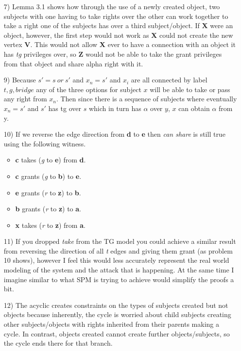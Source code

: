 \documentclass[journal,onecolumn]{IEEEtran}
\begin{document}
\begin{enumerate}
  \item [7)] Lemma 3.1 shows how through the use of a newly created object, two subjects with one having to take rights over the other can work together to take a right one of the subjects has over a third subject/object. If \textbf{X} were an object, however, the first step would not work as \textbf{X} could not create the new vertex \textbf{V}. This would not allow \textbf{X} ever to have a connection with an object it has \textit{tg} privileges over, so \textbf{Z} would not be able to take the grant privileges from that object and share alpha right with it. 
  \item [9)] Because \(s' = s\:or\:s'\) and \(x_n = s'\) and \(x_i\) are all connected by label \(t,g,bridge\) any of the three options for subject \(x\) will be able to take or pass any right from \(x_n\). Then since there is a sequence of subjects where eventually \(x_n = s'\) and \(s'\) has tg over \(s\) which in turn has \(\alpha\) over \(y\), \(x\) can obtain \(\alpha\) from y. 
  \item [10)] If we reverse the edge direction from \textbf{d} to \textbf{e} then \textit{can share} is still true using the following witness.
  \begin{itemize}
    \item \textbf{c} takes (\textit{g} to \textbf{e}) from \textbf{d}.
    \item \textbf{c} grants (\textit{g} to \textbf{b}) to \textbf{e}.
    \item \textbf{e} grants (\textit{r} to \textbf{z}) to \textbf{b}.
    \item \textbf{b} grants (\textit{r} to \textbf{z}) to \textbf{a}.
    \item \textbf{x} takes (\textit{r} to \textbf{z}) from \textbf{a}.
  \end{itemize}
  \item [11)] If you dropped \textit{take} from the TG model you could achieve a similar result from reversing the direction of all \textit{t} edges and giving them grant (as problem 10 shows), however I feel this would less accurately represent the real world modeling of the system and the attack that is happening. At the same time I imagine similar to what SPM is trying to achieve would simplify the proofs a bit. 
  \item [12)] The acyclic creates constraints on the types of subjects created but not objects because inherently, the cycle is worried about child subjects creating other subjects/objects with rights inherited from their parents making a cycle. In contrast, objects created cannot create further objects/subjects, so the cycle ends there for that branch. 
\end{enumerate}
\end{document}
